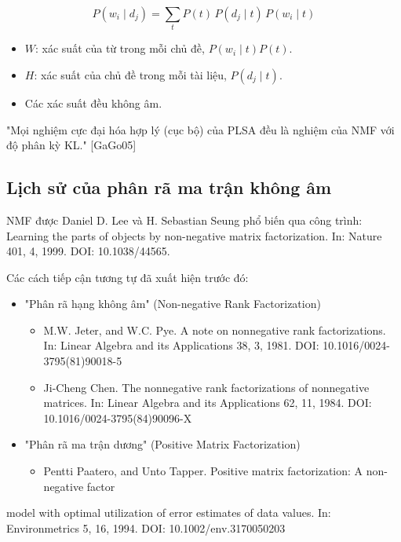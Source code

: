 \[P(w_i \mid d_j) = \sum_t P(t)\,P(d_j \mid t)\,P(w_i \mid t)\]

\begin{itemize}
\item
  \(W\): xác suất của từ trong mỗi chủ đề, \(P(w_i \mid t)P(t)\).
\item
  \(H\): xác suất của chủ đề trong mỗi tài liệu, \(P(d_j \mid t)\).
\item
  Các xác suất đều không âm.
\end{itemize}

"Mọi nghiệm cực đại hóa hợp lý (cục bộ) của PLSA đều là nghiệm của NMF với độ phân kỳ KL." {[}GaGo05{]}

\subsection{Lịch sử của phân rã ma trận không âm}

NMF được Daniel D. Lee và H. Sebastian Seung phổ biến qua công trình: Learning the parts of objects by non-negative matrix factorization. In: Nature 401, 4, 1999. DOI: 10.1038/44565.

Các cách tiếp cận tương tự đã xuất hiện trước đó:

\begin{itemize}
\item
  "Phân rã hạng không âm" (Non-negative Rank Factorization)

  \begin{itemize}
    \item
    M.W. Jeter, and W.C. Pye. A note on nonnegative rank factorizations. In: Linear Algebra and its Applications 38, 3, 1981. DOI: 10.1016/0024-3795(81)90018-5
  \item
    Ji-Cheng Chen. The nonnegative rank factorizations of nonnegative matrices. In: Linear Algebra and its Applications 62, 11, 1984. DOI: 10.1016/0024-3795(84)90096-X
  \end{itemize}
\item
  "Phân rã ma trận dương" (Positive Matrix Factorization)

  \begin{itemize}
    \item
    Pentti Paatero, and Unto Tapper. Positive matrix factorization: A non-negative factor
  \end{itemize}
\end{itemize}

model with optimal utilization of error estimates of data values. In: Environmetrics 5, 16, 1994. DOI: 10.1002/env.3170050203

